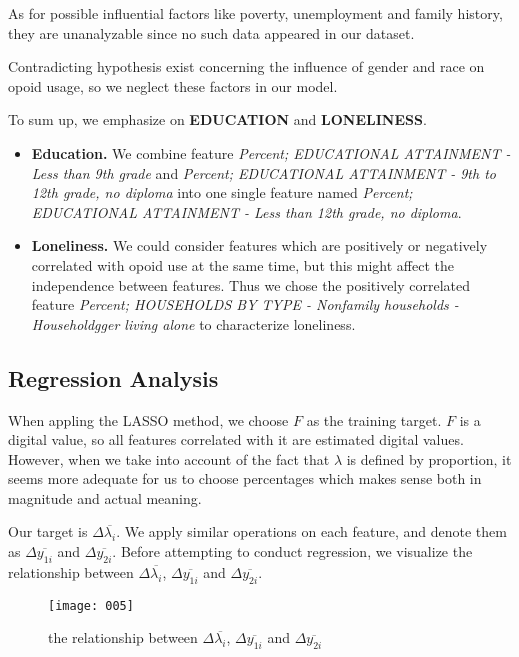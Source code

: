 As for possible influential factors like poverty, unemployment and family history, they are unanalyzable since no such data appeared in our dataset.

Contradicting hypothesis exist concerning the influence of gender and race on opoid usage, so we neglect these factors in our model.

To sum up, we emphasize on \textbf{EDUCATION} and \textbf{LONELINESS}. 

\begin{itemize}
\item \textbf{Education.}
We combine feature \textit{Percent; EDUCATIONAL ATTAINMENT - Less than 9th grade} and \textit{Percent; EDUCATIONAL ATTAINMENT - 9th to 12th grade, no diploma} into one single feature named \textit{Percent; EDUCATIONAL ATTAINMENT - Less than 12th grade, no diploma}.

\item \textbf{Loneliness.}
We could consider features which are positively or negatively correlated with opoid use at the same time, but this might affect the independence between features. Thus we chose the positively correlated feature \textit{Percent; HOUSEHOLDS BY TYPE - Nonfamily households - Householdgger living alone} to characterize loneliness.
\end{itemize}

\subsection{Regression Analysis}


When appling the LASSO method, we choose $F$ as the training target. $F$ is a digital value, so all features correlated with it are estimated digital values. However, when we take into account of the fact that $\lambda$ is defined by proportion, it seems more adequate for us to choose percentages which makes sense both in magnitude and actual meaning.


Our target is $\Delta \overline{\lambda_i}$. We apply similar operations on each feature, and denote them as $\Delta \overline{y_{1i}}$ and  $\Delta \overline{y_{2i}}$. Before attempting to conduct regression, we visualize the relationship between $\Delta \overline{\lambda_i}$, $\Delta \overline{y_{1i}}$ and  $\Delta \overline{y_{2i}}$.
\begin{figure}[H]
	\centering
	\texttt{[image: 005]}
	\caption{the relationship between $\Delta \overline{\lambda_i}$, $\Delta \overline{y_{1i}}$ and  $\Delta \overline{y_{2i}}$}
\end{figure}

